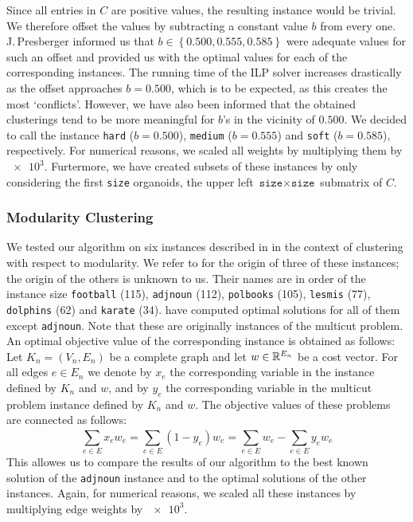 Since all entries in $C$ are positive values, the resulting \CP instance would be trivial.
We therefore offset the values by subtracting a constant value $b$ from every one.
J.\,Presberger informed us that $b \in \left\{ 0.500, 0.555, 0.585 \right\}$ were adequate values for such an offset and provided us with the optimal values for each of the corresponding instances.
The running time of the ILP solver increases drastically as the offset approaches $b = 0.500$, which is to be expected, as this creates the most ‘conflicts’.
However, we have also been informed that the obtained clusterings tend to be more meaningful for $b$’s in the vicinity of $0.500$.
We decided to call the instance \texttt{hard} ($b= 0.500$), \texttt{medium} ($b = 0.555$) and \texttt{soft} ($b = 0.585$), respectively.
For numerical reasons, we scaled all weights by multiplying them by $\num{e3}$.
Furtermore, we have created subsets of these instances by only considering the first \texttt{size} organoids, \ie the upper left $\texttt{size} \times \texttt{size}$ submatrix of $C$.

\subsubsection{Modularity Clustering}
We tested our algorithm on six instances described in \cite{kappesComparativeStudyModern2015} in the context of clustering with respect to modularity.
We refer to \cite{brandesModularityClustering2008} for the origin of three of these instances; the origin of the others is unknown to us.
Their names are in order of the instance size \texttt{football} (115), \texttt{adjnoun} (112), \texttt{polbooks} (105), \texttt{lesmis} (77), \texttt{dolphins} (62) and \texttt{karate} (34).
\cite{kappesComparativeStudyModern2015} have computed optimal solutions for all of them except \texttt{adjnoun}.
Note that these are originally instances of the multicut problem.
An optimal objective value of the corresponding \CP instance is obtained as follows:
Let $K_{n} = (V_{n}, E_{n})$ be a complete graph and let $w \in \mathbb{R}^{E_{n}}$ be a cost vector.
For all edges $e \in E_{n}$ we denote by $x_{e}$ the corresponding variable in the \CP instance defined by $K_{n}$ and $w$, and by $y_{e}$ the corresponding variable in the multicut problem instance defined by $K_{n}$ and $w$.
The objective values of these problems are connected as follows:
\[
	\sum_{e \in E} x_{e} w_{e} = \sum_{e \in E}^{} (1-y_{e}) w_{e} = \sum_{e \in E}^{} w_{e} - \sum_{e \in E}^{} y_{e} w_{e}
\]
This allowes us to compare the results of our algorithm to the best known solution of the \texttt{adjnoun} instance and to the optimal solutions of the other instances. 
Again, for numerical reasons, we scaled all these instances by multiplying edge weights by $\num{e3}$.

